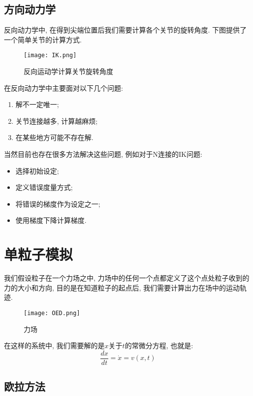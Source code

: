 \subsection{方向动力学}

反向动力学中, 在得到尖端位置后我们需要计算各个关节的旋转角度. 下图提供了一个简单关节的计算方式. 

\begin{figure}[H]
	\centering
	\texttt{[image: IK.png]}
	\caption{反向运动学计算关节旋转角度}
	\label{fig:ik}
\end{figure}

在反向动力学中主要面对以下几个问题: 
\begin{enumerate}
	\item 解不一定唯一; 
	\item 关节连接越多, 计算越麻烦; 
	\item 在某些地方可能不存在解. 
\end{enumerate}

当然目前也存在很多方法解决这些问题, 例如对于N连接的IK问题: 

\begin{itemize}
	\item 选择初始设定; 
	\item 定义错误度量方式; 
	\item 将错误的梯度作为设定之一; 
	\item 使用梯度下降计算梯度. 
\end{itemize}

\section{单粒子模拟}

我们假设粒子在一个力场之中, 力场中的任何一个点都定义了这个点处粒子收到的力的大小和方向, 目的是在知道粒子的起点后, 我们需要计算出力在场中的运动轨迹. 

\begin{figure}[H]
	\centering
	\texttt{[image: OED.png]}
	\caption{力场}
	\label{fig:OED}
\end{figure}

在这样的系统中, 我们需要解的是$x$关于$t$的常微分方程, 也就是: 
\begin{equation}
	\frac{d x}{d t}=\dot{x}=v(x, t)
\end{equation}

\subsection{欧拉方法}

